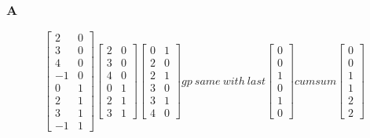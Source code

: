 \documentclass[,table,dvipsnames]{article}
\begin{document}
\subsubsection{A}
\[  
\begin{bmatrix}
2 & 0 \\ 3 & 0 \\  4 & 0 \\ -1 & 0 \\ 0 & 1\\ 2 & 1\\ 3 & 1 \\ -1 & 1
\end{bmatrix} 
\begin{bmatrix}
2 & 0 \\ 3 & 0 \\  4 & 0 \\ 0 & 1\\ 2 & 1\\ 3 & 1 
\end{bmatrix} 
\begin{bmatrix}
0 & 1 \\ 2 & 0 \\  2 & 1 \\ 3 & 0\\ 3 & 1\\ 4 & 0 
\end{bmatrix} 
gp\ same\ with\ last
\begin{bmatrix}
0 \\ 0 \\ 1 \\ 0 \\ 1 \\ 0 
\end{bmatrix} 
cumsum
\begin{bmatrix}
0 \\ 0 \\ 1 \\ 1 \\ 2 \\ 2 
\end{bmatrix} 
\]
\end{document}
